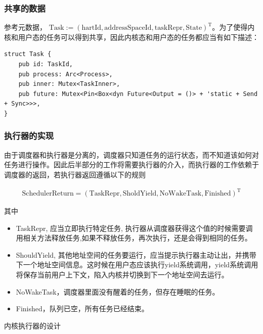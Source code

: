 \subsubsection{共享的数据}

参考元数据， $\boldsymbol{\mathrm{Task}} := (\mathrm{hartId}, \mathrm{addressSpaceId}, \mathrm{taskRepr}, \mathrm{State})^{\mathrm{T}}$。为了使得内核和用户态的任务可以得到共享，因此内核态和用户态的任务都应当有如下描述：

\begin{lstlisting}
struct Task {
    pub id: TaskId,
    pub process: Arc<Process>,
    pub inner: Mutex<TaskInner>,
    pub future: Mutex<Pin<Box<dyn Future<Output = ()> + 'static + Send + Sync>>>, 
}
\end{lstlisting}

\subsubsection{执行器的实现}

由于调度器和执行器是分离的，调度器只知道任务的运行状态，而不知道该如何对任务进行操作。因此后半部分的工作将需要执行器的介入，而执行器的工作依赖于调度器的返回，若执行器返回遵循以下的规则

\begin{equation}
    \label{equation:c3schedulerreturn}
    \begin{aligned}
\boldsymbol{\mathrm{SchedulerReturn}} = (\mathrm{TaskRepr}, \mathrm{SholdYield}, \mathrm{NoWakeTask}, \mathrm{Finished})^{\mathrm{T}}
    \end{aligned}
\end{equation}

其中

\begin{itemize}
    \item TaskRepr, 应当立即执行特定任务, 执行器从调度器获得这个值的时候需要调用相关方法释放任务,如果不释放任务，再次执行，还是会得到相同的任务。
    \item ShouldYield, 其他地址空间的任务要运行，应当提示执行器主动让出，并携带下一个地址空间信息。这时候在用户态应该执行yield系统调用，yield系统调用将保存当前用户上下文，陷入内核并切换到下一个地址空间去运行。
    \item  NoWakeTask，调度器里面没有醒着的任务，但存在睡眠的任务。
    \item  Finished，队列已空，所有任务已经结束。
\end{itemize}


内核执行器的设计


